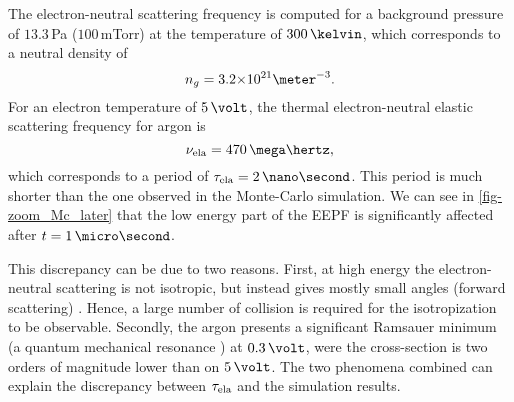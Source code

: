     \vspace{1em}
    The electron-neutral scattering frequency is computed for a background pressure of $13.3$\,Pa (${100}$\,mTorr) at the temperature of $300\,\kelvin$, which corresponds to a neutral density of $${n_g = \sn{3.2}{21} \meter^{-3}}.$$
    For an electron temperature of $5\,\volt$, the thermal electron-neutral elastic scattering frequency for argon is \citep[p.73]{lieberman2005}
    \[ \nu_{\rm ela} = 470 \,\mega\hertz,  \] 
    which corresponds to a period of $\tau_{\rm ela} = 2 \,\nano\second$.
    This period is much shorter than the one observed in the Monte-Carlo simulation.
    We can see in \cref{fig-zoom_Mc_later} that the low energy part of the EEPF is significantly affected after $t=1\,\micro\second$.
    
    This discrepancy can be due to two reasons.
    First, at high energy the electron-neutral scattering is not isotropic, but instead gives mostly small angles (forward scattering) \citep{vahedi1995}.
    Hence, a large number of collision is required for the isotropization to be observable.
    Secondly, the argon presents a significant Ramsauer minimum (a quantum mechanical resonance \citep{lieberman2005}) at $0.3 \,\volt$, were the cross-section is two orders of magnitude lower than on $5\,\volt$.
    The two phenomena combined can explain the discrepancy between $\tau_{\rm ela}$ and the simulation results.
  